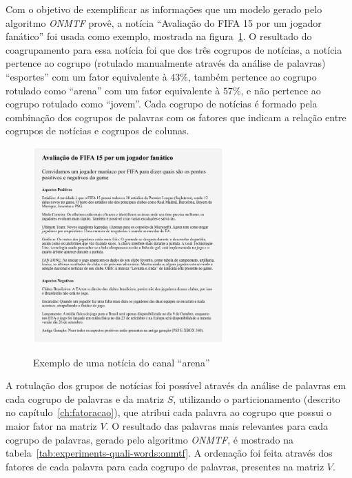 \documentclass[
    12pt,                %
    oneside,            %
    a4paper,            %
    english,            %
    brazil                %
    ]{abntex2ppgsi}
\begin{document}
Com o objetivo de exemplificar as informações que um modelo gerado pelo algoritmo \textit{ONMTF} provê, a notícia ``Avaliação do FIFA 15 por um jogador fanático'' foi usada como exemplo, mostrada na figura~\ref{fig:sample-news}.
O resultado do coagrupamento para essa notícia foi que dos três cogrupos de notícias, a notícia pertence ao cogrupo (rotulado manualmente através da análise de palavras) ``esportes'' com um fator equivalente à $43\%$, também pertence ao cogrupo rotulado como ``arena'' com um fator equivalente à $57\%$, e não pertence ao cogrupo rotulado como ``jovem''.
Cada cogrupo de notícias é formado pela combinação dos cogrupos de palavras com os fatores que indicam a relação entre cogrupos de notícias e cogrupos de colunas.

\begin{figure}[H]
    \centering
    \caption{Exemplo de uma notícia do canal ``arena''}
    \includegraphics[width=0.65\textwidth]{img/arenaNews.png}
    \label{fig:sample-news}
\end{figure}

A rotulação dos grupos de notícias foi possível através da análise de palavras em cada cogrupo de palavras e da matriz $S$, utilizando o particionamento (descrito no capítulo~\ref{ch:fatoracao}), que atribui cada palavra ao cogrupo que possui o maior fator na matriz $V$.
O resultado das palavras mais relevantes para cada cogrupo de palavras, gerado pelo algoritmo \textit{ONMTF}, é mostrado na tabela~\ref{tab:experiments-quali-words:onmtf}.
A ordenação foi feita através dos fatores de cada palavra para cada cogrupo de palavras, presentes na matriz $V$.
\end{document}
